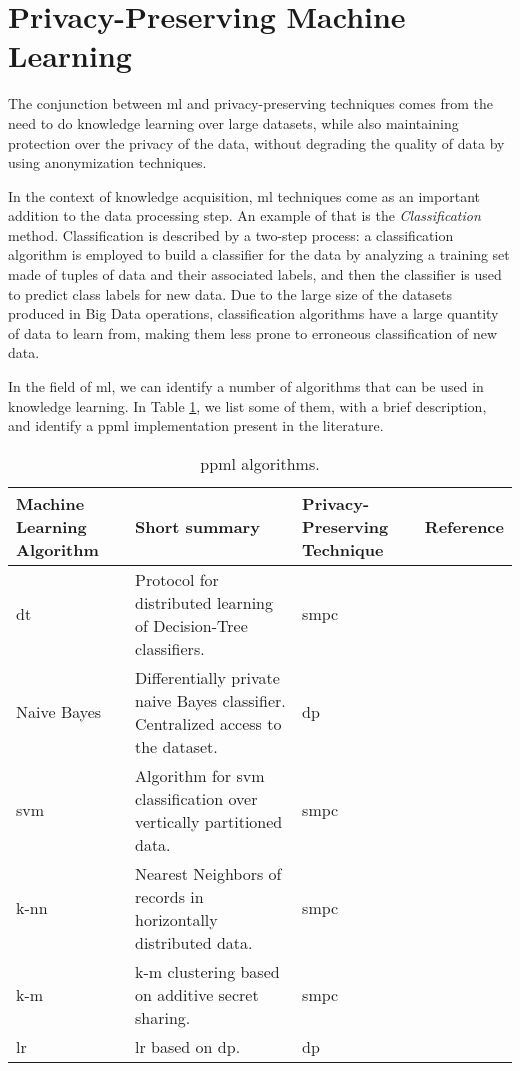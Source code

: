 \section{Privacy-Preserving Machine Learning}
\label{sec:PrivacyPreservingMachineLearning}

The conjunction between \ac{ml} and privacy-preserving techniques comes from the need to do knowledge learning over large datasets, while also maintaining protection over the privacy of the data, without degrading the quality of data by using anonymization techniques.

In the context of knowledge acquisition, \ac{ml} techniques come as an important addition to the data processing step. An example of that is the \textit{Classification} method. Classification is described by a two-step process: a classification algorithm is employed to build a classifier for the data by analyzing a training set made of tuples of data and their associated labels, and then the classifier is used to predict class labels for new data. Due to the large size of the datasets produced in Big Data operations, classification algorithms have a large quantity of data to learn from, making them less prone to erroneous classification of new data.


In the field of \ac{ml}, we can identify a number of algorithms that can be used in knowledge learning. In Table \ref{table:ppml1}, we list some of them, with a brief description, and identify a \ac{ppml} implementation present in the literature.

\begin{table}[htp]
\centering
\caption{\ac{ppml} algorithms.}
\label{table:ppml1}
\begin{tabular}{|p{2.3cm}|p{5cm}|p{3.7cm}|l|}
\hline
\textbf{Machine Learning Algorithm} & \textbf{Short summary} & \textbf{Privacy-Preserving Technique} 
& \textbf{Reference} \\ \hline
\acs{dt} & Protocol for distributed learning of Decision-Tree classifiers. & \ac{smpc} & \cite{brickell2009privacy} \\ \hline
Naive Bayes & Differentially private naive Bayes classifier. Centralized access to the dataset. & \ac{dp} &\cite{vaidya2013differentially} \\ \hline
\acs{svm}  &Algorithm for \acl{svm} classification over vertically partitioned data. & \ac{smpc} & \cite{yu2006privacy} \\ \hline
\acs{k-nn}  & Nearest Neighbors of records in horizontally distributed data. & \ac{smpc}  & \cite{shaneck2006privacy} \\ \hline
\acs{k-m} & \acl{k-m} clustering based on additive secret sharing. & \ac{smpc}  & \cite{doganay2008distributed} \\\hline
\acs{lr} & \acl{lr} based on \acl{dp}.    &  \ac{dp} & \cite{chaudhuri2009privacy} \\\hline
\end{tabular}
\end{table}


